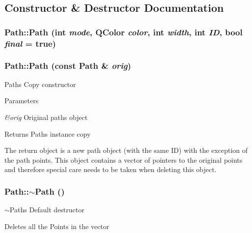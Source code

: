 \subsection{Constructor \& Destructor Documentation}
\hypertarget{classPath_a5bf647496429909133e8f4f224f8f882}{
\subsubsection[{Path}]{\setlength{\rightskip}{0pt plus 5cm}Path::Path (int {\em mode}, \/  QColor {\em color}, \/  int {\em width}, \/  int {\em ID}, \/  bool {\em final} = {\ttfamily true})}}
\label{classPath_a5bf647496429909133e8f4f224f8f882}
\hypertarget{classPath_a5e77b7ba66269d687e0f42a41088fc82}{
\subsubsection[{Path}]{\setlength{\rightskip}{0pt plus 5cm}Path::Path (const {\bf Path} \& {\em orig})}}
\label{classPath_a5e77b7ba66269d687e0f42a41088fc82}
Paths Copy constructor 
\begin{DoxyParams}{Parameters}
\item[{\em \&orig}]Original paths object \end{DoxyParams}
\begin{DoxyReturn}{Returns}
Paths instance copy
\end{DoxyReturn}
The return object is a new path object (with the same ID) with the exception of the path points. This object contains a vector of pointers to the original points and therefore special care needs to be taken when deleting this object. \hypertarget{classPath_a141da9ff89c85e0ba410b5a73864c267}{
\subsubsection[{$\sim$Path}]{\setlength{\rightskip}{0pt plus 5cm}Path::$\sim$Path ()}}
\label{classPath_a141da9ff89c85e0ba410b5a73864c267}
$\sim$Paths Default destructor

Deletes all the Points in the vector 

